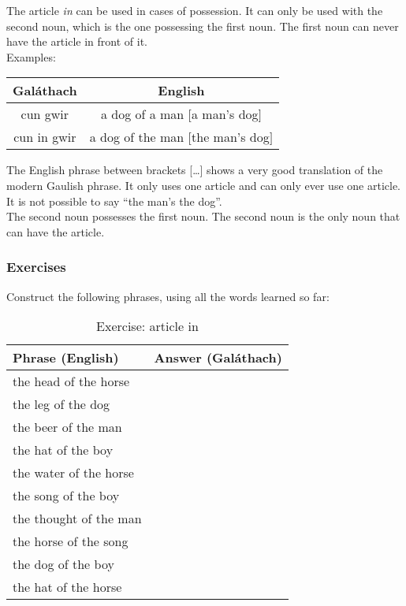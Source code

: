 \noindent The article \textit{in} can be used in cases of possession. It can only be used with the second noun, which is the one possessing the first noun. The first noun can never have the article in front of it.\\
\noindent Examples:
\begin{table}[H]
\centering
\begin{tabu}{c|c}
  \textbf{Gal\'{a}thach} & \textbf{English}\\
  \toprule
  cun gwir & a dog of a man $[$a man's dog$]$\\
  cun in gwir & a dog of the man $[$the man's dog$]$
\end{tabu}
\label{examples_possession_first_noun_no_particle_in_front}
\end{table}

\noindent The English phrase between brackets [\dots] shows a very good translation of the modern Gaulish phrase. It only uses one article and can only ever use one article. It is not possible to say ``the man's the dog''.\\

\noindent The second noun possesses the first noun. The second noun is the only noun that can have the article.

\subsubsection{Exercises}

\noindent Construct the following phrases, using all the words learned so far:
\begin{table}[H]
\centering
\begin{tabu}{|l|p{10.0cm}|}
  \toprule
  \textbf{Phrase (English)} & \textbf{Answer (Gal\'{a}thach)}\\
  \toprule
  the head of the horse & \\
  \midrule
  the leg of the dog & \\
  \midrule
  the beer of the man & \\
  \midrule
  the hat of the boy & \\
  \midrule
  the water of the horse & \\
  \midrule
  the song of the boy & \\
  \midrule
  the thought of the man & \\
  \midrule
  the horse of the song & \\
  \midrule
  the dog of the boy & \\
  \midrule
  the hat of the horse & \\
  \bottomrule
\end{tabu}
\label{exercises_article_in}
\caption{Exercise: article in}
\end{table}


